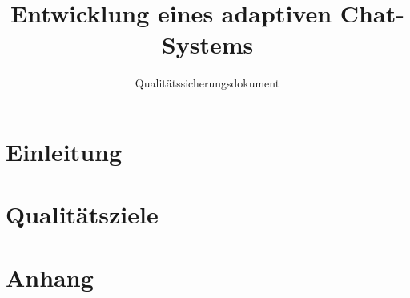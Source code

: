 \documentclass[accentcolor=tud0b,12pt,paper=a4]{tudreport}
\title{Entwicklung eines adaptiven Chat-Systems}
\subtitle{Qualitätssicherungsdokument}
\begin{document}
  \maketitle
  \tableofcontents

  \chapter{Einleitung}
  

  \chapter{Qualitätsziele}
  


\appendix
  \chapter{Anhang}
  
\end{document}
